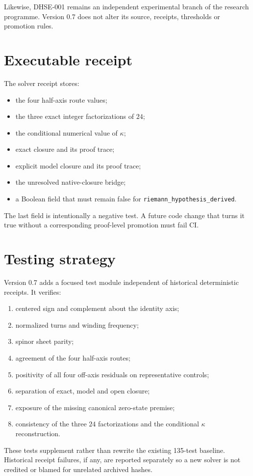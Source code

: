 Likewise, DHSE-001 remains an independent experimental branch of the research
programme.  Version 0.7 does not alter its source, receipts, thresholds or
promotion rules.

\section{Executable receipt}

The solver receipt stores:
\begin{itemize}
 \item the four half-axis route values;
 \item the three exact integer factorizations of $24$;
 \item the conditional numerical value of $\kappa$;
 \item exact closure and its proof trace;
 \item explicit model closure and its proof trace;
 \item the unresolved native-closure bridge;
 \item a Boolean field that must remain false for
 \texttt{riemann\_hypothesis\_derived}.
\end{itemize}
The last field is intentionally a negative test.  A future code change that
turns it true without a corresponding proof-level promotion must fail CI.

\section{Testing strategy}

Version 0.7 adds a focused test module independent of historical deterministic
receipts.  It verifies:
\begin{enumerate}
 \item centered sign and complement about the identity axis;
 \item normalized turns and winding frequency;
 \item spinor sheet parity;
 \item agreement of the four half-axis routes;
 \item positivity of all four off-axis residuals on representative controls;
 \item separation of exact, model and open closure;
 \item exposure of the missing canonical zero-state premise;
 \item consistency of the three $24$ factorizations and the conditional
 $\kappa$ reconstruction.
\end{enumerate}
These tests supplement rather than rewrite the existing 135-test baseline.
Historical receipt failures, if any, are reported separately so a new solver is
not credited or blamed for unrelated archived hashes.

